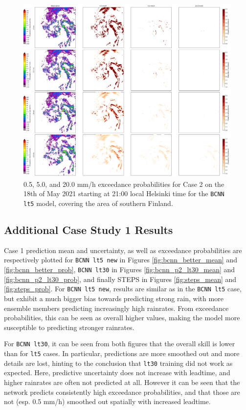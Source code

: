 \begin{figure}[ht]
	\centering
	\includegraphics[width=\textwidth]{images/cases/bcnn_prob_case2}
	\caption{0.5, 5.0, and 20.0 mm/h exceedance probabilities for Case 2 on the 18th of May 2021 starting at 21:00 local Helsinki time for the \texttt{BCNN lt5} model, covering the area of southern Finland.}
	\label{fig:bcnn_prob_case2}
\end{figure}

\subsection{Additional Case Study 1 Results}

Case 1 prediction mean and uncertainty, as well as exceedance probabilities are respectively plotted for \texttt{BCNN lt5 new} in Figures \ref{fig:bcnn_better_mean} and \ref{fig:bcnn_better_prob}, \texttt{BCNN lt30} in Figures \ref{fig:bcnn_p2_lt30_mean} and \ref{fig:bcnn_p2_lt30_prob}, and finally STEPS in Figures \ref{fig:steps_mean} and \ref{fig:steps_prob}. For \texttt{BCNN lt5 new}, results are similar as in the \texttt{BCNN lt5} case, but exhibit a much bigger bias towards predicting strong rain, with more ensemble members predicting increasingly high rainrates. From exceedance probabilities, this can be seen as overall higher values, making the model more susceptible to predicting stronger rainrates. 

For \texttt{BCNN lt30}, it can be seen from both figures that the overall skill is lower than for \texttt{lt5} cases. In particular, predictions are more smoothed out and more details are lost, hinting to the conclusion that \texttt{lt30} training did not work as expected. Here, predictive uncertainty does not increase with leadtime, and higher rainrates are often not predicted at all. However it can be seen that the network predicts consistently high exceedance probabilities, and that those are not (esp. 0.5 mm/h) smoothed out spatially with increased leadtime. 


